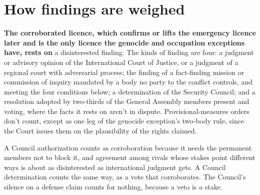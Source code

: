 \section{How findings are weighed}
\label{sec:F.1}
\textbf{The corroborated licence, which confirms or lifts the emergency licence later and is the only licence the genocide and occupation exceptions have, rests on} a disinterested finding. The kinds of finding are four: a judgment or advisory opinion of the International Court of Justice, or a judgment of a regional court with adversarial process; the finding of a fact-finding mission or commission of inquiry mandated by a body no party to the conflict controls, and meeting the four conditions below; a determination of the Security Council; and a resolution adopted by two-thirds of the General Assembly members present and voting, where the facts it rests on aren't in dispute. Provisional-measures orders don't count, except as one leg of the genocide exception's two-body rule, since the Court issues them on the plausibility of the rights claimed.

A Council authorization counts as corroboration because it needs the permanent members not to block it, and agreement among rivals whose stakes point different ways is about as disinterested as international judgment gets. A Council determination counts the same way, as a vote that corroborates. The Council's silence on a defense claim counts for nothing, because a veto is a stake.

